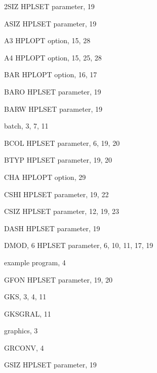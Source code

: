 \begin{theindex}
 
  \item 2SIZ
    \subitem HPLSET parameter, 19
 
  \indexspace
 
  \item ASIZ
    \subitem HPLSET parameter, 19
  \item A3
    \subitem HPLOPT option, 15, 28
  \item A4
    \subitem HPLOPT option, 15, 25, 28
 
  \indexspace
 
  \item BAR
    \subitem HPLOPT option, 16, 17
  \item BARO
    \subitem HPLSET parameter, 19
  \item BARW
    \subitem HPLSET parameter, 19
  \item batch, 3, 7, 11
  \item BCOL
    \subitem HPLSET parameter, 6, 19, 20
  \item BTYP
    \subitem HPLSET parameter, 19, 20
 
  \indexspace
 
  \item CHA
    \subitem HPLOPT option, 29
  \item CSHI
    \subitem HPLSET parameter, 19, 22
  \item CSIZ
    \subitem HPLSET parameter, 12, 19, 23
 
  \indexspace
 
  \item DASH
    \subitem HPLSET parameter, 19
  \item DMOD, 6
    \subitem HPLSET parameter, 6, 10, 11, 17, 19
 
  \indexspace
 
  \item example program, 4
 
  \indexspace
 
  \item GFON
    \subitem HPLSET parameter, 19, 20
  \item GKS, 3, 4, 11
  \item GKSGRAL, 11
  \item graphics, 3
  \item GRCONV, 4
  \item GSIZ
    \subitem HPLSET parameter, 19
 
  \indexspace
 

\end{theindex}
